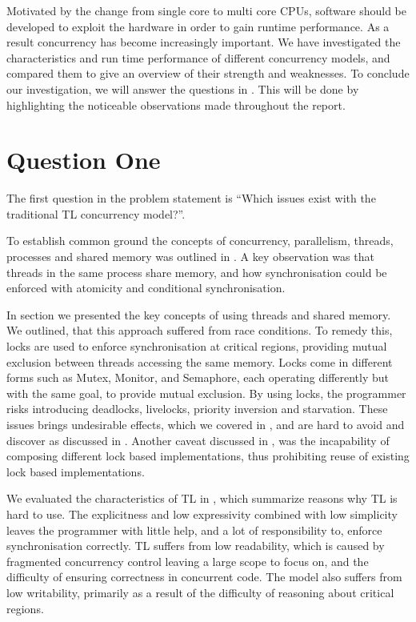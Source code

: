 \makeatletter {}\makeatother
{}
%
Motivated by the change from single core to multi core \acp{CPU}, software should be developed to exploit the hardware in order to gain runtime performance. As a result concurrency has become increasingly important. We have investigated the characteristics and run time performance of different concurrency models, and compared them to give an overview of their strength and weaknesses. To conclude our investigation, we will answer the questions in . This will be done by highlighting the noticeable observations made throughout the report.
\label{chap:conclusion}
\section{Question One}
The first question in the problem statement is ``Which issues exist with the traditional \ac{TL} concurrency model?''. 

To establish common ground the concepts of concurrency, parallelism, threads, processes and shared memory was outlined in . A key observation was that threads in the same process share memory, and how synchronisation could be enforced with atomicity and conditional synchronisation.

In section  we presented the key concepts of using threads and shared memory. We outlined, that this approach suffered from race conditions. To remedy this, locks are used to enforce synchronisation at critical regions, providing mutual exclusion between threads accessing the same memory. Locks come in different forms such as Mutex, Monitor, and Semaphore, each operating differently but with the same goal, to provide mutual exclusion. By using locks, the programmer risks introducing deadlocks, livelocks, priority inversion and starvation. These issues brings undesirable effects, which we covered in , and are hard to avoid and discover as discussed in . Another caveat discussed in , was the incapability of composing different lock based implementations, thus prohibiting reuse of existing lock based implementations. 

We evaluated the characteristics of \ac{TL} in , which summarize reasons why \ac{TL} is hard to use. The explicitness and low expressivity combined with low simplicity leaves the programmer with little help, and a lot of responsibility to, enforce synchronisation correctly. \ac{TL} suffers from low readability, which is caused by fragmented concurrency control leaving a large scope to focus on, and the difficulty of ensuring correctness in concurrent code. The model also suffers from low writability, primarily as a result of the difficulty of reasoning about critical regions.

